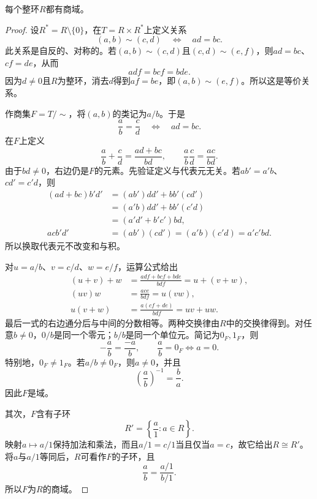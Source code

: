 \begin{theorem}\label{p2:fraction-field}
每个整环$R$都有商域。
\end{theorem}
\begin{proof}
设$R^*=R\setminus\{0\}$，在$T=R\times R^*$上定义关系
\[
(a,b)\sim(c,d)\quad\Longleftrightarrow\quad ad=bc.
\]
此关系是自反的、对称的。若$(a,b)\sim(c,d)$且$(c,d)\sim(e,f)$，则$ad=bc$、$cf=de$，从而
\[
adf=bcf=bde.
\]
因为$d\ne0$且$R$为整环，消去$d$得到$af=be$，即$(a,b)\sim(e,f)$。所以这是等价关系。

作商集$F=T/{\sim}$，将$(a,b)$的类记为$a/b$。于是
\[
\frac ab=\frac cd\quad\Longleftrightarrow\quad ad=bc.
\]
在$F$上定义
\[
\frac ab+\frac cd=\frac{ad+bc}{bd},\qquad
\frac ab\frac cd=\frac{ac}{bd}.
\]
由于$bd\ne0$，右边仍是$F$的元素。先验证定义与代表元无关。若$ab'=a'b$、$cd'=c'd$，则
\begin{align*}
(ad+bc)b'd'
&=(ab')dd'+bb'(cd')\\
&=(a'b)dd'+bb'(c'd)\\
&=(a'd'+b'c')bd,\\
acb'd'&=(ab')(cd')=(a'b)(c'd)=a'c'bd.
\end{align*}
所以换取代表元不改变和与积。

对$u=a/b$、$v=c/d$、$w=e/f$，运算公式给出
\begin{align*}
(u+v)+w&=\frac{adf+bcf+bde}{bdf}=u+(v+w),\\
(uv)w&=\frac{ace}{bdf}=u(vw),\\
u(v+w)&=\frac{a(cf+de)}{bdf}=uv+uw.
\end{align*}
最后一式的右边通分后与中间的分数相等。两种交换律由$R$中的交换律得到。对任意$b\ne0$，$0/b$是同一个零元；$b/b$是同一个单位元。简记为$0_F,1_F$，则
\[
-\frac ab=\frac{-a}{b},\qquad
\frac ab=0_F\Longleftrightarrow a=0.
\]
特别地，$0_F\ne1_F$。若$a/b\ne0_F$，则$a\ne0$，并且
\[
\left(\frac ab\right)^{-1}=\frac ba.
\]
因此$F$是域。

其次，$F$含有子环
\[
R'=\left\{\frac a1:a\in R\right\}.
\]
映射$a\mapsto a/1$保持加法和乘法，而且$a/1=c/1$当且仅当$a=c$，故它给出$R\cong R'$。将$a$与$a/1$等同后，$R$可看作$F$的子环，且
\[
\frac ab=\frac{a/1}{b/1}.
\]
所以$F$为$R$的商域。
\end{proof}

